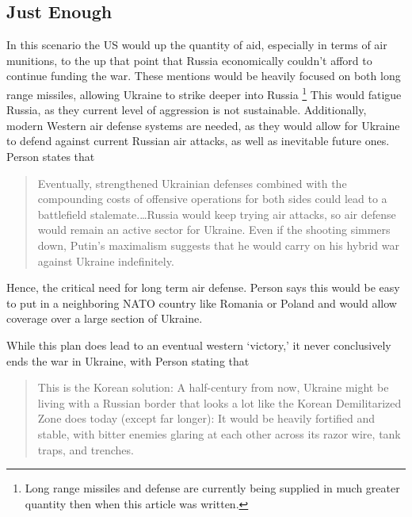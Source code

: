 \documentclass{article}
\begin{document}
    \subsection{Just Enough}

        In this scenario the US would up the quantity of aid, especially in terms of air munitions, to the up that point that Russia economically couldn't afford to continue funding the war. These mentions would be heavily focused on both long range missiles, allowing Ukraine to strike deeper into Russia \footnote{Long range missiles and defense are currently being supplied in much greater quantity then when this article was written.} This would fatigue Russia, as they current level of aggression is not sustainable. Additionally, modern Western air defense systems are needed, as they would allow for Ukraine to defend against current Russian air attacks, as well as inevitable future ones. Person states that 
        
        \begin{quote}
            Eventually, strengthened Ukrainian defenses combined with the compounding costs of offensive operations for both sides could lead to a battlefield stalemate.\ldots Russia would keep trying air attacks, so air defense would remain an active sector for Ukraine. Even if the shooting simmers down, Putin's maximalism suggests that he would carry on his hybrid war against Ukraine indefinitely.
        \end{quote}

        Hence, the critical need for long term air defense. Person says this would be easy to put in a neighboring NATO country like Romania or Poland and would allow coverage over a large section of Ukraine.
        
        While this plan does lead to an eventual western `victory,' it never conclusively ends the war in Ukraine, with Person stating that 

        \begin{quote}
            This is the Korean solution: A half-century from now, Ukraine might be living with a Russian border that looks a lot like the Korean Demilitarized Zone does today (except far longer): It would be heavily fortified and stable, with bitter enemies glaring at each other across its razor wire, tank traps, and trenches.
        \end{quote}
\end{document}
